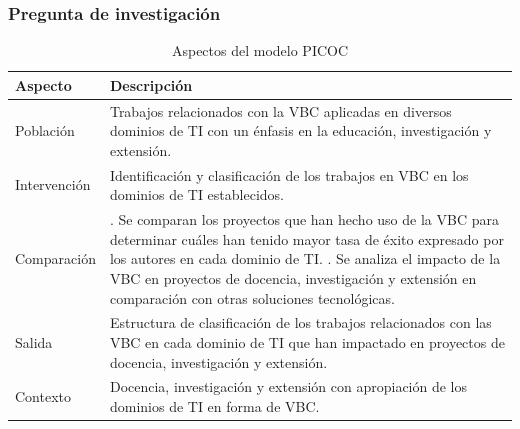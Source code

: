 \subsubsection{Pregunta de investigación}
\mbox{}

\begin{table}[tbp]
    \scriptsize %
    \centering
    \renewcommand{\arraystretch}{1.3}
    \begin{tabularx}{\columnwidth}{>{\centering\arraybackslash}m{} >{\RaggedRight\arraybackslash}X}
        \hline
        \textbf{Aspecto} & \textbf{Descripción} \\
        \hline
        Población & Trabajos relacionados con la VBC aplicadas en diversos dominios de TI con un énfasis en la educación, investigación y extensión. \\
        Intervención & Identificación y clasificación de los trabajos en VBC en los dominios de TI establecidos. \\
        Comparación & 
        1. Se comparan los proyectos que han hecho uso de la VBC para determinar cuáles han tenido mayor tasa de éxito expresado por los autores en cada dominio de TI. \newline
        2. Se analiza el impacto de la VBC en proyectos de docencia, investigación y extensión en comparación con otras soluciones tecnológicas. \\
        Salida & Estructura de clasificación de los trabajos relacionados con las VBC en cada dominio de TI que han impactado en proyectos de docencia, investigación y extensión. \\
        Contexto & Docencia, investigación y extensión con apropiación de los dominios de TI en forma de VBC. \\
        \hline
    \end{tabularx}
    \caption{Aspectos del modelo PICOC}\label{tab:PICOC}
\end{table}

